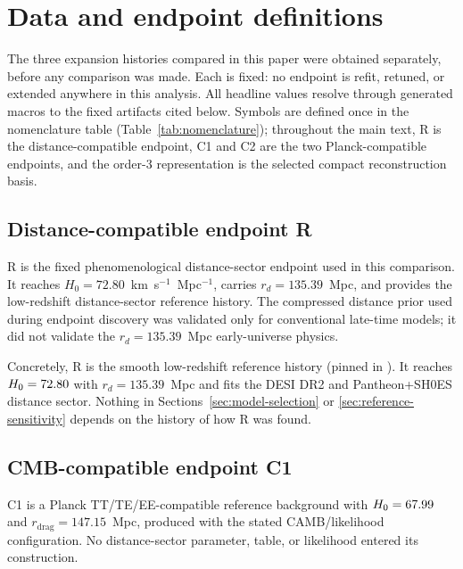 \section{Data and endpoint definitions}
\label{sec:endpoints}
\label{sec:data-endpoints}

The three expansion histories compared in this paper were obtained
separately, before any comparison was made. Each is fixed: no
endpoint is refit, retuned, or extended anywhere in this analysis.
All headline values resolve through generated macros to the fixed
artifacts cited below. Symbols are defined once in the nomenclature
table (Table~\ref{tab:nomenclature}); throughout the main text,
R is the distance-compatible endpoint, C1 and C2 are the two
Planck-compatible endpoints, and the order-3 representation is the selected compact
reconstruction basis.



\subsection{Distance-compatible endpoint R}
\label{sec:endpoint-r}

R is the fixed phenomenological distance-sector endpoint used in this comparison. It reaches $H_0=72.80$~km~s$^{-1}$~Mpc$^{-1}$, carries $r_d=135.39$~Mpc, and provides the low-redshift distance-sector reference history. The
compressed distance prior \citep{Chen2019} used during endpoint
discovery was validated only for conventional late-time models; it did
not validate the $r_{d}=135.39$~Mpc early-universe physics.

Concretely, R is the smooth low-redshift reference history
(pinned in
).
It reaches $H_{0}=72.80$\kmsMpc{} with
$r_{d}=135.39$~Mpc and fits the DESI DR2 and Pantheon+SH0ES distance
sector. Nothing in Sections~\ref{sec:model-selection} or
\ref{sec:reference-sensitivity} depends on the history of how R was found.

\subsection{CMB-compatible endpoint C1}
\label{sec:endpoint-c1}

C1 is a Planck TT/TE/EE-compatible reference background with
$H_{0}=67.99$\kmsMpc{} and
$r_{\mathrm{drag}}=147.15$~Mpc, produced with the stated
CAMB/likelihood configuration.
No distance-sector parameter, table, or likelihood entered its construction.

